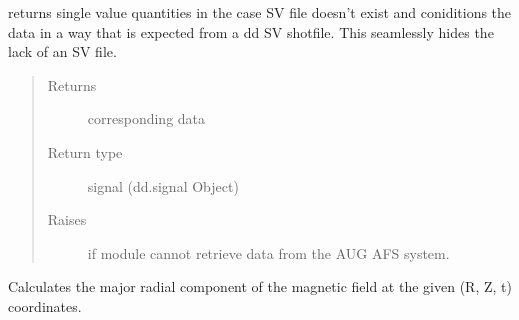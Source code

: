 \documentclass[letterpaper,10pt,english]{sphinxmanual}
\begin{document}
\begin{fulllineitems}
\begin{fulllineitems}
\begin{quote}
\begin{description}
\end{description}\end{quote}

\end{fulllineitems}


\begin{fulllineitems}
\label{\detokenize{eqtools:eqtools.AUGData.AUGDDData.getSSQ}}
returns single value quantities in the case SV file doesn’t exist
and coniditions the data in a way that is expected from a dd SV
shotfile. This seamlessly hides the lack of an SV file.
\begin{quote}\begin{description}
\item[{Returns}] \leavevmode
corresponding data

\item[{Return type}] \leavevmode
signal (dd.signal Object)

\item[{Raises}] \leavevmode
{} \textendash{} if module cannot retrieve data from the AUG AFS system.

\end{description}\end{quote}

\end{fulllineitems}


\begin{fulllineitems}
\label{\detokenize{eqtools:eqtools.AUGData.AUGDDData.rz2BR}}
Calculates the major radial component of the magnetic field at the given (R, Z, t) coordinates.


\end{fulllineitems}
\end{fulllineitems}
\end{document}
